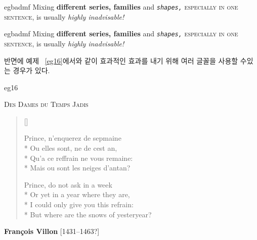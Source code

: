 \begin{egsource}{egbadmf}
Mixing \textbf{different series, \textsf{families}} and
\textsl{\texttt{shapes,}} \textsc{especially in one sentence,} 
is usually \emph{highly inadvisable!}
\end{egsource}
\begin{egresult}{egbadmf}
Mixing \textbf{different series, \textsf{families}} and
\textsl{\texttt{shapes,}} \textsc{especially in one sentence,} 
is usually \emph{highly inadvisable!}
\end{egresult}

반면에 예제 ~\ref{eg16}에서와 같이 효과적인 효과를 내기 위해 여러 글꼴을 사용할 수있는 경우가 있다.

\begin{egsource}{eg16}
\begin{center}
\textsc{Des Dames du Temps Jadis}
\end{center}%
\settowidth{\versewidth}{Or yet in a year where they are}
\begin{verse}[\versewidth] \begin{itshape}
Prince, n'enquerez de sepmaine \\*
Ou elles sont, ne de cest an, \\*
Qu'a ce reffrain ne vous remaine: \\*
Mais ou sont les neiges d'antan?
\end{itshape}

Prince, do not ask in a week \\*
Or yet in a year where they are, \\*
I could only give you this refrain: \\*
But where are the snows of yesteryear?
\end{verse}
\begin{flushright}
{\bfseries Fran\c{c}ois Villon} [1431--1463?]
\end{flushright}
\end{egsource}

